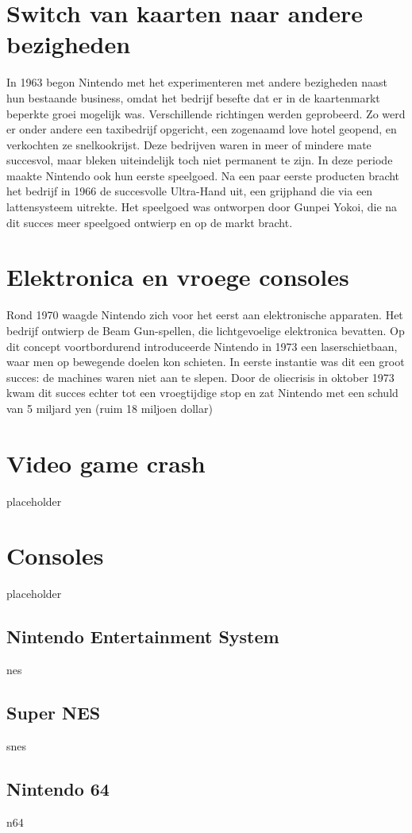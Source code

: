 \documentclass{article}
\begin{document}
\section{Switch van kaarten naar andere bezigheden}
In 1963 begon Nintendo met het experimenteren met andere bezigheden naast hun bestaande business, omdat het bedrijf besefte dat er in de kaartenmarkt beperkte groei mogelijk was. Verschillende richtingen werden geprobeerd. Zo werd er onder andere een taxibedrijf opgericht, een zogenaamd love hotel geopend, en verkochten ze snelkookrijst. Deze bedrijven waren in meer of mindere mate succesvol, maar bleken uiteindelijk toch niet permanent te zijn. 
In deze periode maakte Nintendo ook hun eerste speelgoed. Na een paar eerste producten bracht het bedrijf in 1966 de succesvolle Ultra-Hand uit, een grijphand die via een lattensysteem uitrekte. Het speelgoed was ontworpen door Gunpei Yokoi, die na dit succes meer speelgoed ontwierp en op de markt bracht.


\section{Elektronica en vroege consoles}
Rond 1970 waagde Nintendo zich voor het eerst aan elektronische apparaten. Het bedrijf ontwierp de Beam Gun-spellen, die lichtgevoelige elektronica bevatten. Op dit concept voortbordurend introduceerde Nintendo in 1973 een laserschietbaan, waar men op bewegende doelen kon schieten. In eerste instantie was dit een groot succes: de machines waren niet aan te slepen. Door de oliecrisis in oktober 1973 kwam dit succes echter tot een vroegtijdige stop en zat Nintendo met een schuld van 5 miljard yen (ruim 18 miljoen dollar)

\section{Video game crash}
placeholder
\section{Consoles}
placeholder
\subsection{Nintendo Entertainment System}
nes
\subsection{Super NES}
snes
\subsection{Nintendo 64}
n64
\end{document}
